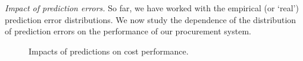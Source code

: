 

\emph{Impact of prediction errors.} So far, we have worked with the
empirical (or `real') prediction error distributions. We now study the
dependence of the distribution of prediction errors on the performance
of our procurement system.

\begin{figure}[!h]    
	\centering
	\vspace{-0.5cm}
	\vspace{-0.2cm}  
	\caption{Impacts of predictions on cost performance.}
	\label{fig:impactOfErrorDistribution}
	\vspace{-0.2cm}
\end{figure}

